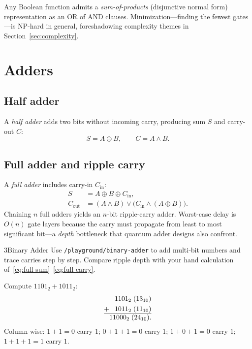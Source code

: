 Any Boolean function admits a \emph{sum-of-products} (disjunctive normal form) representation as an OR of AND clauses. Minimization---finding the fewest gates---is NP-hard in general, foreshadowing complexity themes in Section~\ref{sec:complexity}.

\section{Adders}
\label{sec:adders}

\subsection{Half adder}

A \emph{half adder} adds two bits without incoming carry, producing sum $S$ and carry-out $C$:
\begin{equation}
S = A\oplus B,\qquad C = A\land B.
\label{eq:half-adder}
\end{equation}

\subsection{Full adder and ripple carry}

A \emph{full adder} includes carry-in $C_{\mathrm{in}}$:
\begin{align}
S &= A\oplus B\oplus C_{\mathrm{in}}, \label{eq:full-sum}\\
C_{\mathrm{out}} &= (A\land B)\lor\bigl(C_{\mathrm{in}}\land(A\oplus B)\bigr). \label{eq:full-carry}
\end{align}
Chaining $n$ full adders yields an $n$-bit ripple-carry adder. Worst-case delay is $O(n)$ gate layers because the carry must propagate from least to most significant bit---a \emph{depth} bottleneck that quantum adder designs also confront.

\begin{labbox}{3}{Binary Adder}
Use \texttt{/playground/binary-adder} to add multi-bit numbers and trace carries step by step. Compare ripple depth with your hand calculation of~\eqref{eq:full-sum}--\eqref{eq:full-carry}.
\end{labbox}

\begin{example}
Compute $1101_2 + 1011_2$:
\begin{align*}
  &\phantom{+}1101_2 \;(13_{10}) \\
  + &\phantom{+}1011_2 \;(11_{10}) \\
  \hline
  &11000_2 \;(24_{10}).
\end{align*}
Column-wise: $1+1=0$ carry $1$; $0+1+1=0$ carry $1$; $1+0+1=0$ carry $1$; $1+1+1=1$ carry $1$.
\end{example}

